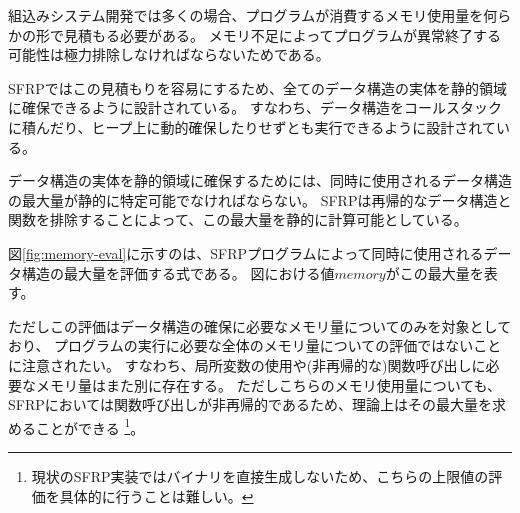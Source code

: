 組込みシステム開発では多くの場合、プログラムが消費するメモリ使用量を何らかの形で見積もる必要がある。
メモリ不足によってプログラムが異常終了する可能性は極力排除しなければならないためである。

SFRPではこの見積もりを容易にするため、全てのデータ構造の実体を静的領域に確保できるように設計されている。
すなわち、データ構造をコールスタックに積んだり、ヒープ上に動的確保したりせずとも実行できるように設計されている。

データ構造の実体を静的領域に確保するためには、同時に使用されるデータ構造の最大量が静的に特定可能でなければならない。
SFRPは再帰的なデータ構造と関数を排除することによって、この最大量を静的に計算可能としている。

図\ref{fig:memory-eval}に示すのは、SFRPプログラムによって同時に使用されるデータ構造の最大量を評価する式である。
図における値$memory$がこの最大量を表す。

ただしこの評価はデータ構造の確保に必要なメモリ量についてのみを対象としており、
プログラムの実行に必要な全体のメモリ量についての評価ではないことに注意されたい。
すなわち、局所変数の使用や(非再帰的な)関数呼び出しに必要なメモリ量はまた別に存在する。
ただしこちらのメモリ使用量についても、SFRPにおいては関数呼び出しが非再帰的であるため、理論上はその最大量を求めることができる
\footnote{
現状のSFRP実装ではバイナリを直接生成しないため、こちらの上限値の評価を具体的に行うことは難しい。
}。



